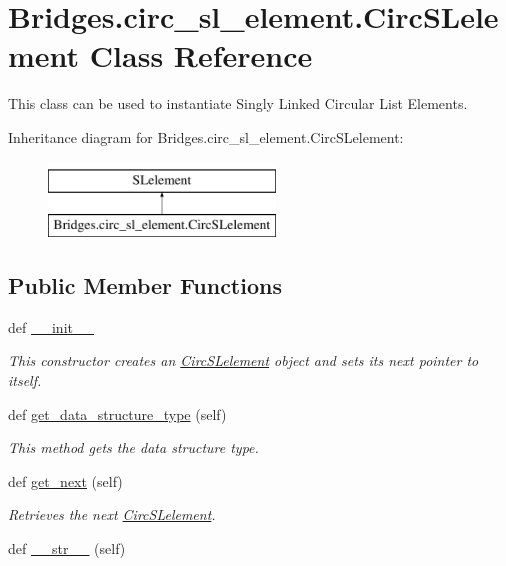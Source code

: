 \hypertarget{class_bridges_1_1circ__sl__element_1_1_circ_s_lelement}{}\section{Bridges.\+circ\+\_\+sl\+\_\+element.\+Circ\+S\+Lelement Class Reference}
\label{class_bridges_1_1circ__sl__element_1_1_circ_s_lelement}


This class can be used to instantiate Singly Linked Circular List Elements.  


Inheritance diagram for Bridges.\+circ\+\_\+sl\+\_\+element.\+Circ\+S\+Lelement\+:\begin{figure}[H]
\begin{center}
\leavevmode
\includegraphics[height=2.000000cm]{class_bridges_1_1circ__sl__element_1_1_circ_s_lelement}
\end{center}
\end{figure}
\subsection*{Public Member Functions}
\begin{DoxyCompactItemize}
\item 
def \hyperlink{class_bridges_1_1circ__sl__element_1_1_circ_s_lelement_a6f1b38f5f3350a4c8d280e938cec3662}{\+\_\+\+\_\+init\+\_\+\+\_\+}
\begin{DoxyCompactList}\small\item\em This constructor creates an \hyperlink{class_bridges_1_1circ__sl__element_1_1_circ_s_lelement}{Circ\+S\+Lelement} object and sets its next pointer to itself. \end{DoxyCompactList}\item 
def \hyperlink{class_bridges_1_1circ__sl__element_1_1_circ_s_lelement_a53774e23afd83780f1a8a64a68892494}{get\+\_\+data\+\_\+structure\+\_\+type} (self)
\begin{DoxyCompactList}\small\item\em This method gets the data structure type. \end{DoxyCompactList}\item 
def \hyperlink{class_bridges_1_1circ__sl__element_1_1_circ_s_lelement_a709b68b1e016734f15c64bde94077d58}{get\+\_\+next} (self)
\begin{DoxyCompactList}\small\item\em Retrieves the next \hyperlink{class_bridges_1_1circ__sl__element_1_1_circ_s_lelement}{Circ\+S\+Lelement}. \end{DoxyCompactList}\item 
def \hyperlink{class_bridges_1_1circ__sl__element_1_1_circ_s_lelement_ab19b10a71d5f93996eb15c19cfaf2688}{\+\_\+\+\_\+str\+\_\+\+\_\+} (self)
\end{DoxyCompactItemize}



